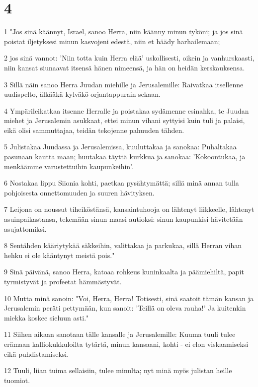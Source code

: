 \chapter{4}

\par 1 "Jos sinä käännyt, Israel, sanoo Herra, niin käänny minun tyköni; ja jos sinä poistat iljetyksesi minun kasvojeni edestä, niin et häädy harhailemaan;
\par 2 jos sinä vannot: 'Niin totta kuin Herra elää' uskollisesti, oikein ja vanhurskaasti, niin kansat siunaavat itsensä hänen nimeensä, ja hän on heidän kerskauksensa.
\par 3 Sillä näin sanoo Herra Juudan miehille ja Jerusalemille: Raivatkaa itsellenne uudispelto, älkääkä kylväkö orjantappurain sekaan.
\par 4 Ympärileikatkaa itsenne Herralle ja poistakaa sydämenne esinahka, te Juudan miehet ja Jerusalemin asukkaat, ettei minun vihani syttyisi kuin tuli ja palaisi, eikä olisi sammuttajaa, teidän tekojenne pahuuden tähden.
\par 5 Julistakaa Juudassa ja Jerusalemissa, kuuluttakaa ja sanokaa: Puhaltakaa pasunaan kautta maan; huutakaa täyttä kurkkua ja sanokaa: 'Kokoontukaa, ja menkäämme varustettuihin kaupunkeihin'.
\par 6 Nostakaa lippu Siionia kohti, paetkaa pysähtymättä; sillä minä annan tulla pohjoisesta onnettomuuden ja suuren hävityksen.
\par 7 Leijona on noussut tiheiköstänsä, kansaintuhooja on lähtenyt liikkeelle, lähtenyt asuinpaikastansa, tekemään sinun maasi autioksi: sinun kaupunkisi hävitetään asujattomiksi.
\par 8 Sentähden kääriytykää säkkeihin, valittakaa ja parkukaa, sillä Herran vihan hehku ei ole kääntynyt meistä pois."
\par 9 Sinä päivänä, sanoo Herra, katoaa rohkeus kuninkaalta ja päämiehiltä, papit tyrmistyvät ja profeetat hämmästyvät.
\par 10 Mutta minä sanoin: "Voi, Herra, Herra! Totisesti, sinä saatoit tämän kansan ja Jerusalemin peräti pettymään, kun sanoit: 'Teillä on oleva rauha!' Ja kuitenkin miekka koskee sieluun asti."
\par 11 Siihen aikaan sanotaan tälle kansalle ja Jerusalemille: Kuuma tuuli tulee erämaan kalliokukkuloilta tytärtä, minun kansaani, kohti - ei elon viskaamiseksi eikä puhdistamiseksi.
\par 12 Tuuli, liian tuima sellaisiin, tulee minulta; nyt minä myös julistan heille tuomiot.
